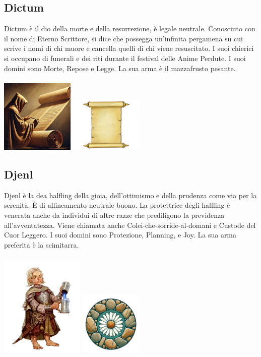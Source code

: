 \documentclass[10pt, a4paper]{report}
\begin{document}
\begin{multicols}{2}
\subsection*{Dictum}
Dictum è il dio della morte e della resurrezione, è legale neutrale. Conosciuto con il nome di Eterno Scrittore, si dice che possegga un'infinita pergamena su cui scrive i nomi di chi muore e cancella quelli di chi viene resuscitato. I suoi chierici si occupano di funerali e dei riti durante il festival delle Anime Perdute. I suoi domini sono Morte, Repose e Legge. La sua arma è il mazzafrusto pesante.\\
\\
\includegraphics[width=3.5cm]{dictum.jpeg}
\includegraphics[width=3.5cm]{dictum_simbolo.png}
\subsection*{Djenl}
Djenl è la dea halfling della gioia, dell'ottimismo e della prudenza come via per la serenità. È di allineamento neutrale buono. La protettrice degli halfling è venerata anche da individui di altre razze che prediligono la previdenza all'avventatezza. Viene chiamata anche Colei-che-sorride-al-domani e Custode del Cuor Leggero. I suoi domini sono Protezione, Planning, e Joy. La sua arma preferita è la scimitarra.\\
\\
\includegraphics[width=4cm]{djenl.png}
\includegraphics[width=3cm]{djenl_simbolo.jpeg}

\end{multicols}
\end{document}
